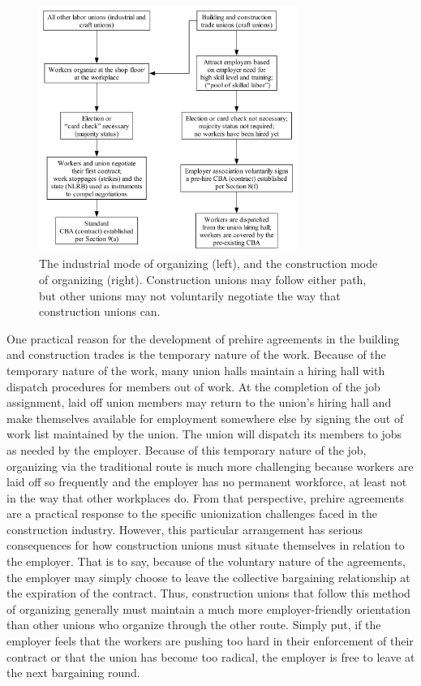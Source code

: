 \begin{figure}
  \centering
  \includegraphics[width=0.75\textwidth]{images/organizing_paths}
  \captionsetup{justification=centering, singlelinecheck=false, margin=2cm}
  \caption{The industrial mode of organizing (left), and the construction mode of organizing (right). Construction unions may follow either path, but other unions may not voluntarily negotiate the way that construction unions can.}
  \label{fig:organizing_paths}
\end{figure}

One practical reason for the development of prehire agreements in the building and construction trades is the temporary nature of the work. Because of the temporary nature of the work, many union halls maintain a hiring hall with dispatch procedures for members out of work. At the completion of the job assignment, laid off union members may return to the union’s hiring hall and make themselves available for employment somewhere else by signing the out of work list maintained by the union. The union will dispatch its members to jobs as needed by the employer. Because of this temporary nature of the job, organizing via the traditional route is much more challenging because workers are laid off so frequently and the employer has no permanent workforce, at least not in the way that other workplaces do. From that perspective, prehire agreements are a practical response to the specific unionization challenges faced in the construction industry. However, this particular arrangement has serious consequences for how construction unions must situate themselves in relation to the employer. That is to say, because of the voluntary nature of the agreements, the employer may simply choose to leave the collective bargaining relationship at the expiration of the contract. Thus, construction unions that follow this method of organizing generally must maintain a much more employer-friendly orientation than other unions who organize through the other route. Simply put, if the employer feels that the workers are pushing too hard in their enforcement of their contract or that the union has become too radical, the employer is free to leave at the next bargaining round.

